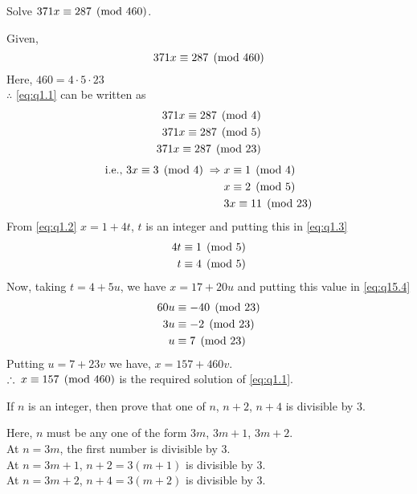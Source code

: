 \documentclass[12pt]{book}
\begin{document}
\begin{qn}[100E]
    Solve $ 371x\equiv 287 \pmod{460} $.
\end{qn}
\begin{soln}
    Given,
    \begin{equation}
        371x\equiv 287 \pmod{460} \label{eq:q1.1}
    \end{equation}
    Here, $ 460=4\cdot5\cdot23 $\\
    $ \therefore $ \eqref{eq:q1.1} can be written as 
    \begin{align*}
        371x\equiv 287 \pmod{4}\\
        371x\equiv 287 \pmod{5}\\
        371x\equiv 287 \pmod{23}
    \end{align*}
    \begin{align}
        \text{i.e., } 3x\equiv 3 \pmod{4}\;\Rightarrow\; & x\equiv 1 \pmod{4}\label{eq:q1.2}\\
        & x\equiv 2 \pmod{5}\label{eq:q1.3}\\
        & 3x\equiv 11 \pmod{23}\label{eq:q1.4}
    \end{align}
    From \eqref{eq:q1.2} $ x=1+4t $, $ t $ is an integer and putting this in \eqref{eq:q1.3}
    \begin{align*}
        4t&\equiv 1 \pmod{5}\\
        t&\equiv 4 \pmod{5}
    \end{align*}
    Now, taking $ t=4+5u $, we have $ x=17+20u $ and putting this value in \eqref{eq:q15.4}
    \begin{align*}
        60u&\equiv -40 \pmod{23}\\
        3u&\equiv -2 \pmod{23}\\
        u&\equiv 7 \pmod{23}
    \end{align*}
    Putting $ u=7+23v $ we have, $ x=157+460v $.\\
    $ \therefore\; x\equiv 157 \pmod{460} $ is the required solution of \eqref{eq:q1.1}.
\end{soln}
\begin{qn}
    If $ n $ is an integer, then prove that one of $ n $, $ n+2 $, $ n+4 $ is divisible by 3.
\end{qn}
\begin{soln}\hfill
    
    
    Here, $ n $ must be any one of the form $ 3m $, $ 3m+1 $, $ 3m+2 $.\\
    At $ n=3m $, the first number is divisible by 3.\\
    At $ n=3m+1 $, $ n+2=3(m+1) $ is divisible by 3.\\
    At $ n=3m+2 $, $ n+4=3(m+2) $ is divisible by 3.
\end{soln}
\end{document}

